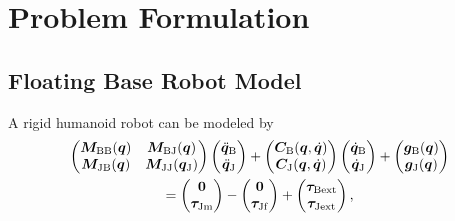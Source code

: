 
\section{Problem Formulation}
\label{sec:task_description}

\subsection{Floating Base Robot Model}
\label{sec:float_base_model}

A rigid humanoid robot can be modeled by
%
\begin{gather}
\small
\begin{pmatrix}
\bm{M}_\mathrm{BB}(\bm{q}) & \bm{M}_\mathrm{BJ}(\bm{q}) \\
\bm{M}_\mathrm{JB}(\bm{q}) & \bm{M}_\mathrm{JJ}(\bm{q}_\mathrm{J}) \\
\end{pmatrix}
\begin{pmatrix}
\ddot{\bm{q}}_\mathrm{B} \\
\ddot{\bm{q}}_\mathrm{J}
\end{pmatrix}
+
\begin{pmatrix}
\bm{C}_\mathrm{B}(\bm{q},\dot{\bm{q}}) \\
\bm{C}_\mathrm{J}(\bm{q},\dot{\bm{q}})
\end{pmatrix}
\begin{pmatrix}
\dot{\bm{q}}_\mathrm{B} \\
\dot{\bm{q}}_\mathrm{J}
\end{pmatrix}
+
\begin{pmatrix}
\bm{g}_\mathrm{B}(\bm{q}) \\
\bm{g}_\mathrm{J}(\bm{q}) \\
\end{pmatrix} \nonumber \\
 =
\begin{pmatrix}
\bm{0} \\
\bm{\tau}_\mathrm{Jm} \\
\end{pmatrix}
-
\begin{pmatrix}
\bm{0} \\
\bm{\tau}_\mathrm{Jf} \\
\end{pmatrix}
+
\begin{pmatrix}
\bm{\tau}_\mathrm{Bext} \\
\bm{\tau}_\mathrm{Jext} \\
\end{pmatrix},
\label{eqn:indyn}
\end{gather}
